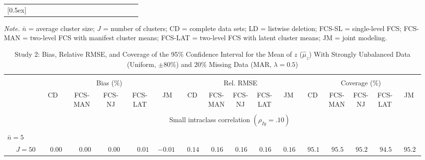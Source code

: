 \begin{sidewaystable}
\begin{threeparttable}
\begin{tabular}{llccccccccccccccc}
[0.5ex]\hline\\[-1.6ex] 
\end{tabular}
\begin{tablenotes}{\footnotesize \textit{Note.} $\bar{n}$ = average cluster size; $J$ = number of clusters; CD = complete data sets; LD = listwise deletion; FCS-SL = single-level FCS; FCS-MAN = two-level FCS with manifest cluster means; FCS-LAT = two-level FCS with latent cluster means; JM = joint modeling.}\end{tablenotes}
\end{threeparttable}
\end{sidewaystable}
\begin{sidewaystable}
\begin{threeparttable}
\setlength{\tabcolsep}{1.0pt}
\renewcommand{\arraystretch}{0.95}
\footnotesize
\caption{\small Study 2: Bias, Relative RMSE, and Coverage of the 95\% Confidence Interval for the Mean of $z$ ($\hat\mu_z$) With Strongly Unbalanced Data (Uniform, $\pm 80\%$) and 20\% Missing Data (MAR, $\lambda=0.5$)}
\begin{tabular}{llccccccccccccccc}
\hline\\[-1.8ex]
& & \multicolumn{5}{c}{Bias (\%)} & \multicolumn{5}{c}{Rel. RMSE} & \multicolumn{5}{c}{Coverage (\%)} \\ \cmidrule(r){3-7}\cmidrule(r){8-12}\cmidrule(r){13-17}
 &  & CD & \makecell{FCS-\\MAN} & \makecell{FCS-\\NJ} & \makecell{FCS-\\LAT} & JM & CD & \makecell{FCS-\\MAN} & \makecell{FCS-\\NJ} & \makecell{FCS-\\LAT} & JM & CD & \makecell{FCS-\\MAN} & \makecell{FCS-\\NJ} & \makecell{FCS-\\LAT} & \multicolumn{1}{c}{JM} \\ 
[0.4ex]\hline\\[-1.8ex]
& & \multicolumn{15}{c}{Small intraclass correlation $(\rho_{Iy}=.10)$} \\[0.6ex]\hline\\[-1.8ex]
\multicolumn{4}{l}{$\bar{n}=5$} \\  & \nopagebreak $\;J=50$  & $\phantom{-}0.00\phantom{0}$ & $\phantom{-}0.00\phantom{0}$ & $\phantom{-}0.00\phantom{0}$ & $\phantom{-}0.01\phantom{0}$ & ${-}0.01\phantom{0}$ & $\phantom{0}0.14\phantom{0}$ & $\phantom{0}0.16\phantom{0}$ & $\phantom{0}0.16\phantom{0}$ & $\phantom{0}0.16\phantom{0}$ & $\phantom{0}0.16\phantom{0}$ & $\phantom{0}95.1\phantom{0}$ & $\phantom{0}95.5\phantom{0}$ & $\phantom{0}95.2\phantom{0}$ & $\phantom{0}94.5\phantom{0}$ & $\phantom{0}95.2\phantom{0}$ \\

\end{tabular}
\end{threeparttable}
\end{sidewaystable}
